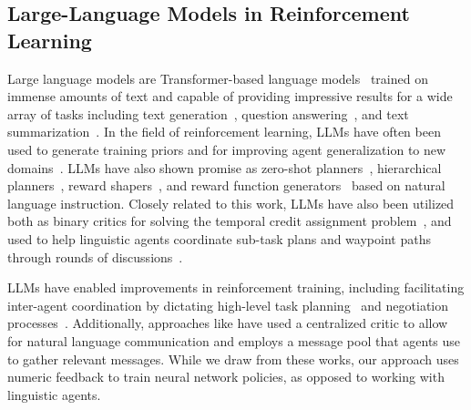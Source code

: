 \subsection{Large-Language Models in Reinforcement Learning}
Large language models are Transformer-based language models~\cite{vaswani2017attention} trained on immense amounts of text and capable of providing impressive results for a wide array of tasks including text generation~\cite{brown2020language}, question answering~\cite{kenton2019bert}, and text summarization~\cite{zhang2020pegasus}. In the field of reinforcement learning, LLMs have often been used to generate training priors and for improving agent  generalization to new domains~\cite{kim2024survey}. LLMs have also shown promise as zero-shot planners~\cite{huang2022language}, hierarchical planners~\cite{taniguchi2024hierarchical, kannan2023smart}, reward shapers~\cite{carta2022eager}, and reward function generators~\cite{goyal2019using} based on natural language instruction. Closely related to this work, LLMs have also been utilized both as binary critics for solving the temporal credit assignment problem~\cite{pignatelli2024assessing}, and used to help linguistic agents coordinate sub-task plans and waypoint paths through rounds of discussions~\cite{mandi2024roco}.

LLMs have enabled improvements in reinforcement training, including facilitating inter-agent coordination by dictating high-level task planning~\cite{zhuang2024yolo} and negotiation processes~\cite{chen2023multi, sun2024llm}. Additionally, approaches like \cite{slumbers2024leveraging} have used a centralized critic to allow for natural language communication and \cite{hongmetagpt} employs a message pool that agents use to gather relevant messages. While we draw from these works, our approach uses numeric feedback to train neural network policies, as opposed to working with linguistic agents.
